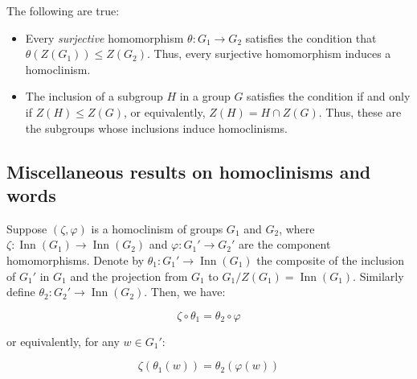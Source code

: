 The following are true:

\begin{itemize}
\item Every {\em surjective} homomorphism $\theta:G_1 \to G_2$
  satisfies the condition that $\theta(Z(G_1)) \le Z(G_2)$. Thus,
  every surjective homomorphism induces a homoclinism.
\item The inclusion of a subgroup $H$ in a group $G$ satisfies the
  condition if and only if $Z(H) \le Z(G)$, or equivalently, $Z(H) = H
  \cap Z(G)$. Thus, these are the subgroups whose inclusions induce
  homoclinisms.
\end{itemize}

\subsection{Miscellaneous results on homoclinisms and words}\label{sec:homoclinism-misc-results}

\begin{lemma}
  Suppose $(\zeta,\varphi)$ is a homoclinism of groups $G_1$ and
  $G_2$, where $\zeta:\operatorname{Inn}(G_1) \to
  \operatorname{Inn}(G_2)$ and $\varphi:G_1' \to G_2'$ are the
  component homomorphisms. Denote by $\theta_1:G_1' \to
  \operatorname{Inn}(G_1)$ the composite of the inclusion of $G_1'$ in
  $G_1$ and the projection from $G_1$ to $G_1/Z(G_1) =
  \operatorname{Inn}(G_1)$. Similarly define $\theta_2:G_2' \to
  \operatorname{Inn}(G_2)$. Then, we have:
  
  $$\zeta \circ \theta_1 = \theta_2 \circ \varphi$$

  or equivalently, for any $w \in G_1'$:

  $$\zeta(\theta_1(w)) = \theta_2(\varphi(w))$$
\end{lemma}

